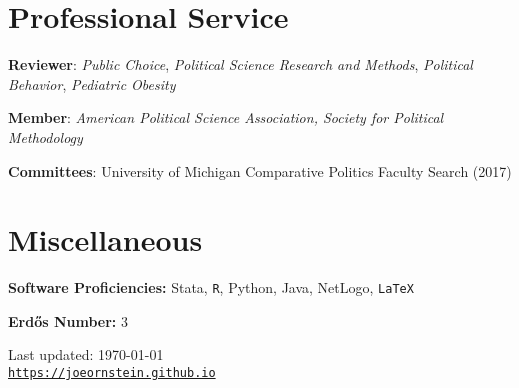 \documentclass[letterpaper]{article}
\def\footerlink{https://joeornstein.github.io}
\renewenvironment{itemize}{
  \begin{list}{}{
    \setlength{\leftmargin}{1.5em}
  }
}{
  \end{list}
}
\begin{document}
\hrulefill

\section*{Professional Service}

\begin{itemize}
\item \textbf{Reviewer}: \textit{Public Choice}, \textit{Political Science Research and Methods}, \textit{Political Behavior}, \textit{Pediatric Obesity}
\item \textbf{Member}: \textit{American Political Science Association, Society for Political Methodology}
\item \textbf{Committees}: University of Michigan Comparative Politics Faculty Search (2017)
\end{itemize}

\hrulefill

\section*{Miscellaneous}
\begin{itemize}
\item \textbf{Software Proficiencies:} Stata, {\tt R}, Python, Java, NetLogo, {\tt LaTeX}
\item \textbf{Erd\H{o}s Number:} 3
\end{itemize}

\bigskip

\begin{center}
  \begin{footnotesize}
    Last updated: \today \\
    \href{\footerlink}{\texttt{\footerlink}}
  \end{footnotesize}
\end{center}
\end{document}
